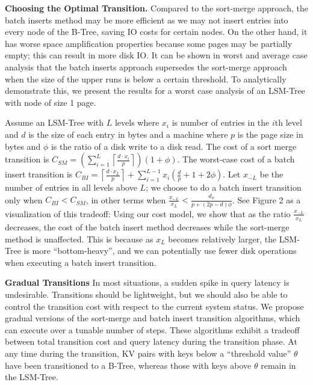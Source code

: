 \documentclass[a4paper,12pt,notitlepage,twoside,openright]{article}
\begin{document}
\textbf{Choosing the Optimal Transition.} Compared to the sort-merge approach, the
batch inserts method may be more efficient as we may not insert entries
into every node of the B-Tree, saving IO costs for certain nodes. On the
other hand, it has worse space amplification properties because some
pages may be partially empty; this can result in more disk IO. It can be
shown in worst and average case analysis that the batch inserts approach
supersedes the sort-merge approach when the size of the upper runs is
below a certain threshold. To analytically demonstrate this, we present
the results for a worst case analysis of an LSM-Tree with node of size 1
page.

Assume an LSM-Tree with \(L\) levels where \(x_i\) is number of
entries in the \(i\)th level and \(d\) is the size of each entry
in bytes and a machine where \(p\) is the page size in bytes and
\( \phi \) is the ratio of a disk write to a disk read. The cost of a sort
merge transition is \(C_{SM} = \left(\sum^L_{i=1} \left\lceil\frac{d \cdot x_i}{p}\right\rceil \right)(1+\phi)\). The worst-case cost of a batch insert transition is
\(C_{BI} = \left\lceil\frac{d \cdot x_L}{p}\right\rceil + \sum^{L-1}_{i=1} x_i \left( \frac{d}{p} + 1 + 2 \phi \right) \). Let
\(x_{-L}\) be the number of entries in all levels
above \(L\); we choose to do a batch insert transition only when
\(C_{BI} < C_{SM}\), in other terms when
\( \frac{x_{-L}}{x_L} < \frac{d_\phi}{p + (2p - d) \phi } \). See Figure 2 as a visualization of this tradeoff: Using our cost model, we show that as the ratio
\( \frac{x_{-L}}{x_L} \) decreases, the cost of the batch insert method decreases while the
sort-merge method is unaffected. This is because as \(x_L\) becomes
relatively larger, the LSM-Tree is more ``bottom-heavy'', and we can
potentially use fewer disk operations when executing a batch insert
transition.

\textbf{Gradual Transitions} In most situations, a sudden spike in query latency
is undesirable. Transitions should be lightweight, but we should also be
able to control the transition cost with respect to the current system
status. We propose gradual versions of the sort-merge and batch insert
transition algorithms, which can execute over a tunable number of steps.
These algorithms exhibit a tradeoff between total transition cost and
query latency during the transition phase. At any time during the
transition, KV pairs with keys below a ``threshold value'' \( \theta \) have
been transitioned to a B-Tree, whereas those with keys above \( \theta \)
remain in the LSM-Tree.
\end{document}
